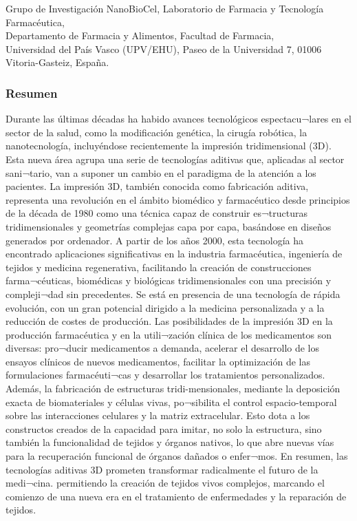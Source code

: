 \documentclass[11pt,a4paper]{article}
\begin{document}
\noindent Grupo de Investigación NanoBioCel, Laboratorio de Farmacia y Tecnología Farmacéutica, \\
Departamento de Farmacia y Alimentos, Facultad de Farmacia, \\
Universidad del País Vasco (UPV/EHU), Paseo de la Universidad 7, 01006 Vitoria-Gasteiz, España.

\subsubsection*{Resumen}

Durante las últimas décadas ha habido avances tecnológicos espectacu¬lares en el sector de la salud, como la modificación genética, la cirugía robótica, la nanotecnología, incluyéndose recientemente la impresión tridimensional (3D). Esta nueva área agrupa una serie de tecnologías aditivas que, aplicadas al sector sani¬tario, van a suponer un cambio en el paradigma de la atención a los pacientes. La impresión 3D, también conocida como fabricación aditiva, representa una revolución en el ámbito biomédico y farmacéutico desde principios de la década de 1980 como una técnica capaz de construir es¬tructuras tridimensionales y geometrías complejas capa por capa, basándose en diseños generados por ordenador. A partir de los años 2000, esta tecnología ha encontrado aplicaciones significativas en la industria farmacéutica, ingeniería de tejidos y medicina regenerativa, facilitando la creación de construcciones farma¬céuticas, biomédicas y biológicas tridimensionales con una precisión y compleji¬dad sin precedentes.  Se está en presencia de una tecnología de rápida evolución, con un gran potencial dirigido a la medicina personalizada y a la reducción de costes de producción. Las posibilidades de la impresión 3D en la producción farmacéutica y en la utili¬zación clínica de los medicamentos son diversas: pro¬ducir medicamentos a demanda, acelerar el desarrollo de los ensayos clínicos de nuevos medicamentos, facilitar la optimización de las formulaciones farmacéuti¬cas y desarrollar los tratamientos personalizados. Además, la fabricación de estructuras tridi-mensionales, mediante la deposición exacta de biomateriales y células vivas, po¬sibilita el control espacio-temporal sobre las interacciones celulares y la matriz extracelular. Esto dota a los constructos creados de la capacidad para imitar, no solo la estructura, sino también la funcionalidad de tejidos y órganos nativos, lo que abre nuevas vías para la recuperación funcional de órganos dañados o enfer¬mos. En resumen, las tecnologías aditivas 3D prometen transformar radicalmente el futuro de la medi¬cina. permitiendo la creación de tejidos vivos complejos, marcando el comienzo de una nueva era en el tratamiento de enfermedades y la reparación de tejidos. 
\end{document}
